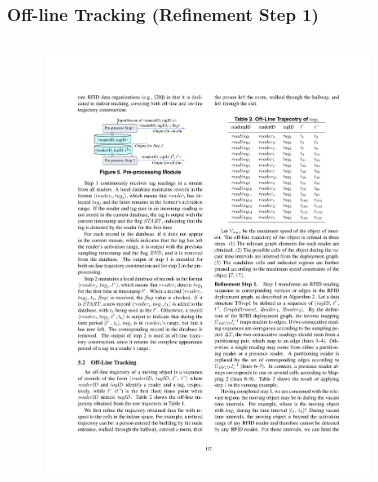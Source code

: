 
\begin{frame}
\frametitle{Off-line Tracking (Refinement Step 1)}

  \begin{columns}[c]

    \vspace{-15pt}
    \begin{figure}[tb]
      \includegraphics[width=0.92\columnwidth]{figures/2-1/2-1-9.pdf}
    \end{figure}
    \vspace{-20pt}
    \begin{figure}[tb]

\end{figure}
\end{columns}
\end{frame}
